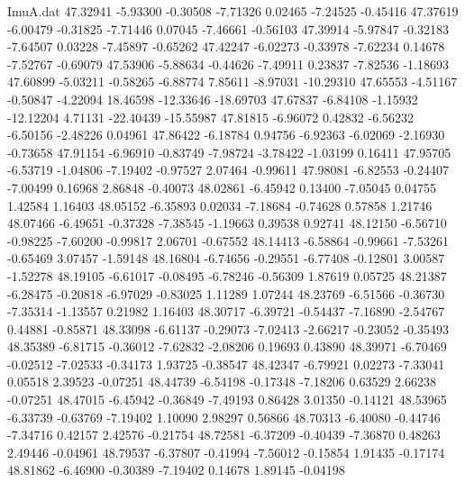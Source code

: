 \begin{filecontents}{ImuA.dat}
  47.32941   -5.93300   -0.30508   -7.71326    0.02465   -7.24525   -0.45416
  47.37619   -6.00479   -0.31825   -7.71446    0.07045   -7.46661   -0.56103
  47.39914   -5.97847   -0.32183   -7.64507    0.03228   -7.45897   -0.65262
  47.42247   -6.02273   -0.33978   -7.62234    0.14678   -7.52767   -0.69079
  47.53906   -5.88634   -0.44626   -7.49911    0.23837   -7.82536   -1.18693
  47.60899   -5.03211   -0.58265   -6.88774    7.85611   -8.97031  -10.29310
  47.65553   -4.51167   -0.50847   -4.22094   18.46598  -12.33646  -18.69703
  47.67837   -6.84108   -1.15932  -12.12204    4.71131  -22.40439  -15.55987
  47.81815   -6.96072    0.42832   -6.56232   -6.50156   -2.48226    0.04961
  47.86422   -6.18784    0.94756   -6.92363   -6.02069   -2.16930   -0.73658
  47.91154   -6.96910   -0.83749   -7.98724   -3.78422   -1.03199    0.16411
  47.95705   -6.53719   -1.04806   -7.19402   -0.97527    2.07464   -0.99611
  47.98081   -6.82553   -0.24407   -7.00499    0.16968    2.86848   -0.40073
  48.02861   -6.45942    0.13400   -7.05045    0.04755    1.42584    1.16403
  48.05152   -6.35893    0.02034   -7.18684   -0.74628    0.57858    1.21746
  48.07466   -6.49651   -0.37328   -7.38545   -1.19663    0.39538    0.92741
  48.12150   -6.56710   -0.98225   -7.60200   -0.99817    2.06701   -0.67552
  48.14413   -6.58864   -0.99661   -7.53261   -0.65469    3.07457   -1.59148
  48.16804   -6.74656   -0.29551   -6.77408   -0.12801    3.00587   -1.52278
  48.19105   -6.61017   -0.08495   -6.78246   -0.56309    1.87619    0.05725
  48.21387   -6.28475   -0.20818   -6.97029   -0.83025    1.11289    1.07244
  48.23769   -6.51566   -0.36730   -7.35314   -1.13557    0.21982    1.16403
  48.30717   -6.39721   -0.54437   -7.16890   -2.54767    0.44881   -0.85871
  48.33098   -6.61137   -0.29073   -7.02413   -2.66217   -0.23052   -0.35493
  48.35389   -6.81715   -0.36012   -7.62832   -2.08206    0.19693    0.43890
  48.39971   -6.70469   -0.02512   -7.02533   -0.34173    1.93725   -0.38547
  48.42347   -6.79921    0.02273   -7.33041    0.05518    2.39523   -0.07251
  48.44739   -6.54198   -0.17348   -7.18206    0.63529    2.66238   -0.07251
  48.47015   -6.45942   -0.36849   -7.49193    0.86428    3.01350   -0.14121
  48.53965   -6.33739   -0.63769   -7.19402    1.10090    2.98297    0.56866
  48.70313   -6.40080   -0.44746   -7.34716    0.42157    2.42576   -0.21754
  48.72581   -6.37209   -0.40439   -7.36870    0.48263    2.49446   -0.04961
  48.79537   -6.37807   -0.41994   -7.56012   -0.15854    1.91435   -0.17174
  48.81862   -6.46900   -0.30389   -7.19402    0.14678    1.89145   -0.04198

\end{filecontents}
